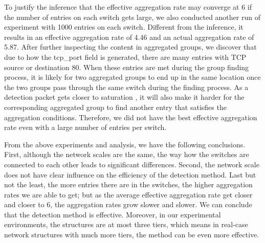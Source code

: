 To justify the inference that the effective aggregation rate may converge at 6 if the number of entries on each switch gets large, we also conducted another run of experiment with 1000 entries on each switch. Different from the inference, it results in an effective aggregation rate of 4.46 and an actual aggregation rate of 5.87. After further inspecting the content in aggregated groups, we discover that due to how the tcp\_port field is generated, there are many entries with TCP source or destination 80. When these entries are met during the group finding process, it is likely for two aggregated groups to end up in the same location once the two groups pass through the same switch during the finding process. As a detection packet gets closer to saturation \sout{}, it will also make it harder for the corresponding aggregated group to find another entry that satisfies the aggregation conditions. Therefore, we did not have the best effective aggregation rate even with a large number of entries per switch. 

From the above experiments and analysis, we have the following conclusions. First, although the network scales are the same, the way how the switches are connected to each other leads to significant differences. Second, the network scale does not have clear influence on the efficiency of the detection method. Last but not the least, the more entries there are in the switches, the higher aggregation rates we are able to get; but as the average effective aggregation rate get closer and closer to 6, the aggregation rates grow slower and slower. We can conclude that the detection method is effective. Moreover, in our experimental environments, the structures are at most three tiers, which means in real-case network structures with much more tiers, the method can be even more effective. 